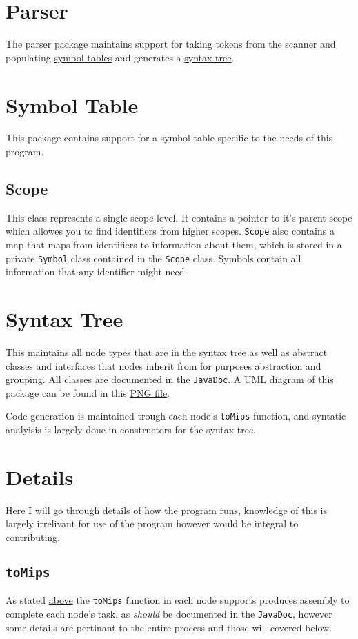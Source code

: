 \documentclass{article}
\def\syntaxtreeUML{SyntaxTreeUML.png}
\begin{document}
\section{Parser} \label{parser}
The parser package maintains support for taking tokens from the scanner and populating \hyperref[symboltable]{symbol tables} and generates a \hyperref[syntaxtree]{syntax tree}.

\section{Symbol Table} \label{symboltable}
This package contains support for a symbol table specific to the needs of this program.

\subsection{Scope}
This class represents a single scope level. It contains a pointer to it's parent scope which allowes you to find identifiers from higher scopes. \texttt{Scope} also contains a map that maps from identifiers to information about them, which is stored in a private \texttt{Symbol} class contained in the \texttt{Scope} class. Symbols contain all information that any identifier might need.

\section{Syntax Tree} \label{syntaxtree}
This maintains all node types that are in the syntax tree as well as abstract classes and interfaces that nodes inherit from for purposes abstraction and grouping. All classes are documented in the \texttt{JavaDoc}. A UML diagram of this package can be found in this \href{\syntaxtreeUML}{PNG file}.

Code generation is maintained trough each node's \texttt{toMips} function, and syntatic analyisis is largely done in constructors for the syntax tree.

\section{Details} \label{details}
Here I will go through details of how the program runs, knowledge of this is largely irrelivant for use of the program however would be integral to contributing.

\subsection{\texttt{toMips}} \label{MIPS codegen}
As stated \hyperref[syntaxtree]{above} the \texttt{toMips} function in each node supports produces assembly to complete each node's task, as \emph{should} be documented in the \texttt{JavaDoc}, however some details are pertinant to the entire process and those will covered below.
\end{document}

